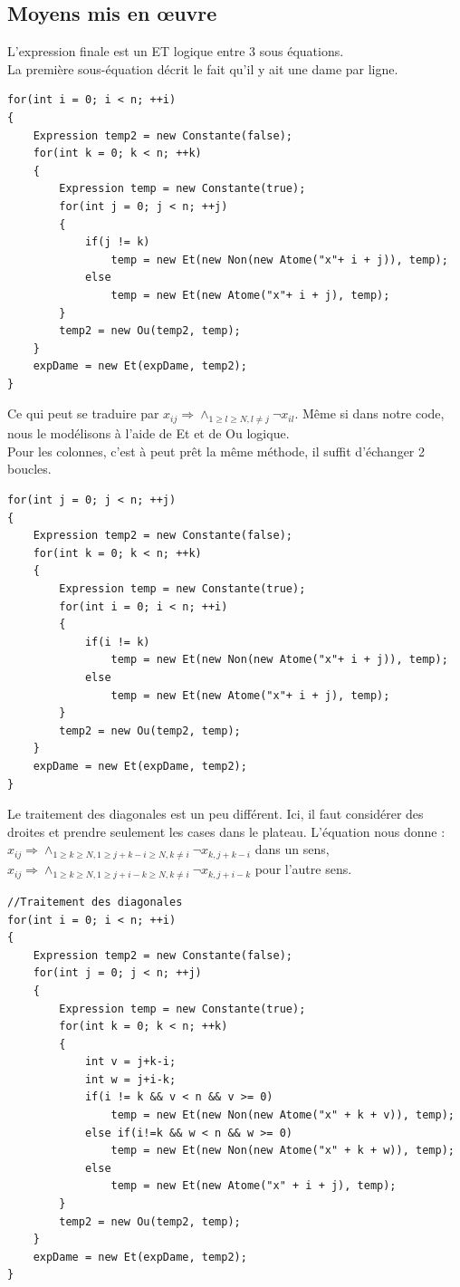 \documentclass{article}
\begin{document}
\subsection{Moyens mis en \oe uvre}
L'expression finale est un ET logique entre 3 sous équations.\\
La première sous-équation décrit le fait qu'il y ait une dame par ligne.
\begin{verbatim}
for(int i = 0; i < n; ++i)
{
	Expression temp2 = new Constante(false);
	for(int k = 0; k < n; ++k)
	{
		Expression temp = new Constante(true);
		for(int j = 0; j < n; ++j)
		{
			if(j != k)
				temp = new Et(new Non(new Atome("x"+ i + j)), temp);
			else
				temp = new Et(new Atome("x"+ i + j), temp);
		}
		temp2 = new Ou(temp2, temp);
	}
	expDame = new Et(expDame, temp2);
}
\end{verbatim}
Ce qui peut se traduire par $x_{ij}\Rightarrow \wedge_{1\geq l\geq N, l\neq j}\neg x_{il}$. Même si dans notre code, nous le modélisons à l'aide de Et et de Ou logique.\\
Pour les colonnes, c'est à peut prêt la même méthode, il suffit d'échanger 2 boucles.
\begin{verbatim}
for(int j = 0; j < n; ++j)
{
	Expression temp2 = new Constante(false);
	for(int k = 0; k < n; ++k)
	{
		Expression temp = new Constante(true);
		for(int i = 0; i < n; ++i)
		{
			if(i != k)
				temp = new Et(new Non(new Atome("x"+ i + j)), temp);
			else
				temp = new Et(new Atome("x"+ i + j), temp);
		}
		temp2 = new Ou(temp2, temp);
	}
	expDame = new Et(expDame, temp2);
}
\end{verbatim}
Le traitement des diagonales est un peu différent. Ici, il faut considérer des droites et prendre seulement les cases dans le plateau. L'équation nous donne : $x_{ij}\Rightarrow \wedge_{1\geq k\geq N, 1\geq j+k-i\geq N, k\neq i}\neg x_{k,j+k-i}$ dans un sens, $x_{ij}\Rightarrow \wedge_{1\geq k\geq N, 1\geq j+i-k\geq N, k\neq i}\neg x_{k,j+i-k}$ pour l'autre sens.
\begin{verbatim}
//Traitement des diagonales 
for(int i = 0; i < n; ++i)
{
	Expression temp2 = new Constante(false);
	for(int j = 0; j < n; ++j)
	{
		Expression temp = new Constante(true);
		for(int k = 0; k < n; ++k)
		{
			int v = j+k-i;
			int w = j+i-k;
			if(i != k && v < n && v >= 0)
				temp = new Et(new Non(new Atome("x" + k + v)), temp);
			else if(i!=k && w < n && w >= 0)
				temp = new Et(new Non(new Atome("x" + k + w)), temp);
			else
				temp = new Et(new Atome("x" + i + j), temp);
		}
		temp2 = new Ou(temp2, temp);
	}
	expDame = new Et(expDame, temp2);
}
\end{verbatim}
\end{document}

